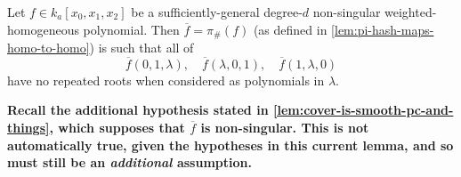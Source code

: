 \documentclass[10pt,notitlepage]{article}
\numberwithin{equation}{subsection}
\newcommand{\cover}[1]{\overline{#1}}
\newcommand{\kathree}{k_a[x_0,x_1,x_2]}
\begin{document}
            \begin{lemma}\label{lem:that-smoothness-lemma}
                Let $f\in\kathree$ be a sufficiently-general degree-$d$ non-singular weighted-homogeneous polynomial.
                Then $\cover{f}=\pi_\#(f)$ (as defined in \cref{lem:pi-hash-maps-homo-to-homo}) is such that all of
                \[
                    \cover{f}(0,1,\lambda),\quad\cover{f}(\lambda,0,1),\quad\cover{f}(1,\lambda,0)
                \]
                have no repeated roots when considered as polynomials in $\lambda$.

                {\color{purple}\textbf{Recall the additional hypothesis stated in \cref{lem:cover-is-smooth-pc-and-things}, which supposes that $\cover{f}$ is non-singular. This is not automatically true, given the hypotheses in this current lemma, and so must still be an \emph{additional} assumption.}}
            \end{lemma}
\end{document}
